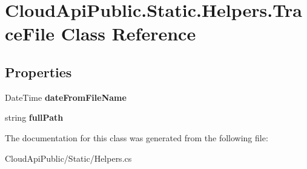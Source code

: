 \hypertarget{class_cloud_api_public_1_1_static_1_1_helpers_1_1_trace_file}{\section{Cloud\-Api\-Public.\-Static.\-Helpers.\-Trace\-File Class Reference}
\label{class_cloud_api_public_1_1_static_1_1_helpers_1_1_trace_file}
}
\subsection*{Properties}
\begin{DoxyCompactItemize}
\item 
\hypertarget{class_cloud_api_public_1_1_static_1_1_helpers_1_1_trace_file_ad96179574cbc7aa7a16d293ec9c109a4}{Date\-Time {\bfseries date\-From\-File\-Name}}\label{class_cloud_api_public_1_1_static_1_1_helpers_1_1_trace_file_ad96179574cbc7aa7a16d293ec9c109a4}

\item 
\hypertarget{class_cloud_api_public_1_1_static_1_1_helpers_1_1_trace_file_af47207098bc769214cfa72d6349c5ad1}{string {\bfseries full\-Path}}\label{class_cloud_api_public_1_1_static_1_1_helpers_1_1_trace_file_af47207098bc769214cfa72d6349c5ad1}

\end{DoxyCompactItemize}


The documentation for this class was generated from the following file\-:\begin{DoxyCompactItemize}
\item 
Cloud\-Api\-Public/\-Static/Helpers.\-cs\end{DoxyCompactItemize}
